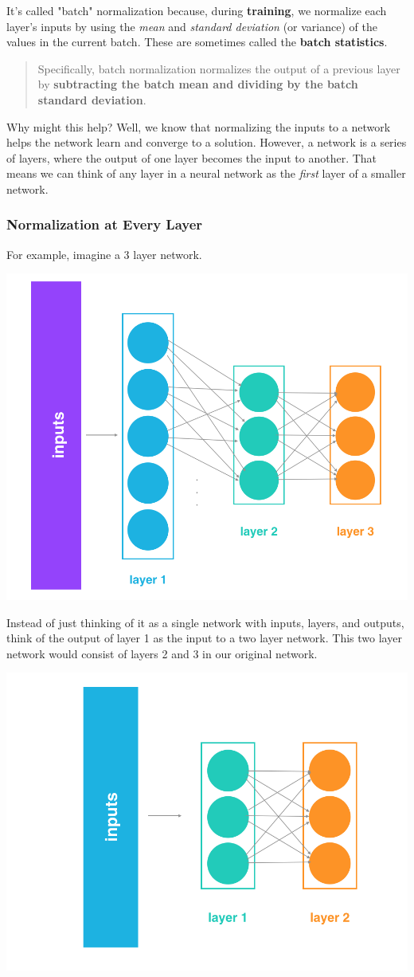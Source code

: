 It's called "batch" normalization because, during \textbf{training}, we normalize each layer's inputs by using the \textit{mean} and \textit{standard deviation} (or variance) of the values in the current batch. These are sometimes called the \textbf{batch statistics}.

\begin{quote}
Specifically, batch normalization normalizes the output of a previous layer by \textbf{subtracting the batch mean and dividing by the batch standard deviation}.

\end{quote}

Why might this help? Well, we know that normalizing the inputs to a network helps the network learn and converge to a solution. However, a network is a series of layers, where the output of one layer becomes the input to another. That means we can think of any layer in a neural network as the \textit{first} layer of a smaller network.

\subsubsection{Normalization at Every Layer}
For example, imagine a 3 layer network.

\includegraphics[width=0.5\linewidth]{img//genAdvNet//deepGAN/3-layers.png}

Instead of just thinking of it as a single network with inputs, layers, and outputs, think of the output of layer 1 as the input to a two layer network. This two layer network would consist of layers 2 and 3 in our original network.

\includegraphics[width=0.5\linewidth]{img//genAdvNet//deepGAN/2-layers.png}


